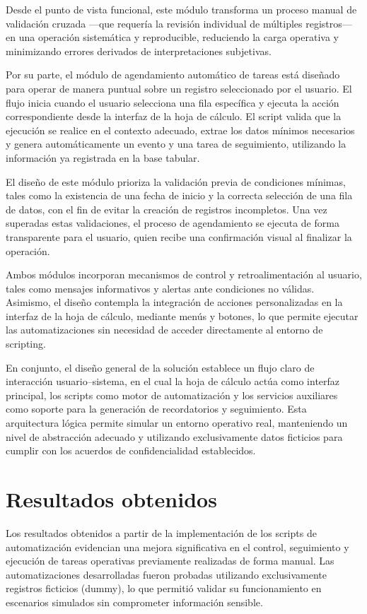 \documentclass[12pt]{article}
\begin{document}
Desde el punto de vista funcional, este módulo transforma un proceso manual de validación cruzada —que requería la revisión individual de múltiples registros— en una operación sistemática y reproducible, reduciendo la carga operativa y minimizando errores derivados de interpretaciones subjetivas.

Por su parte, el módulo de agendamiento automático de tareas está diseñado para operar de manera puntual sobre un registro seleccionado por el usuario. El flujo inicia cuando el usuario selecciona una fila específica y ejecuta la acción correspondiente desde la interfaz de la hoja de cálculo. El script valida que la ejecución se realice en el contexto adecuado, extrae los datos mínimos necesarios y genera automáticamente un evento y una tarea de seguimiento, utilizando la información ya registrada en la base tabular.

El diseño de este módulo prioriza la validación previa de condiciones mínimas, tales como la existencia de una fecha de inicio y la correcta selección de una fila de datos, con el fin de evitar la creación de registros incompletos. Una vez superadas estas validaciones, el proceso de agendamiento se ejecuta de forma transparente para el usuario, quien recibe una confirmación visual al finalizar la operación.

Ambos módulos incorporan mecanismos de control y retroalimentación al usuario, tales como mensajes informativos y alertas ante condiciones no válidas. Asimismo, el diseño contempla la integración de acciones personalizadas en la interfaz de la hoja de cálculo, mediante menús y botones, lo que permite ejecutar las automatizaciones sin necesidad de acceder directamente al entorno de scripting.

En conjunto, el diseño general de la solución establece un flujo claro de interacción usuario–sistema, en el cual la hoja de cálculo actúa como interfaz principal, los scripts como motor de automatización y los servicios auxiliares como soporte para la generación de recordatorios y seguimiento. Esta arquitectura lógica permite simular un entorno operativo real, manteniendo un nivel de abstracción adecuado y utilizando exclusivamente datos ficticios para cumplir con los acuerdos de confidencialidad establecidos.


\section*{Resultados obtenidos}

Los resultados obtenidos a partir de la implementación de los scripts de automatización evidencian una mejora significativa en el control, seguimiento y ejecución de tareas operativas previamente realizadas de forma manual. Las automatizaciones desarrolladas fueron probadas utilizando exclusivamente registros ficticios (dummy), lo que permitió validar su funcionamiento en escenarios simulados sin comprometer información sensible.
\end{document}
